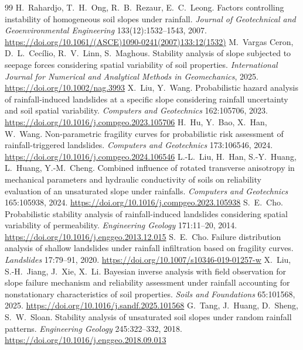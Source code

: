 \documentclass[11pt,a4paper]{article}
\begin{document}
\begin{thebibliography}{99}\small
{} H.~Rahardjo, T.~H.~Ong, R.~B.~Rezaur, E.~C.~Leong. Factors controlling instability of
  homogeneous soil slopes under rainfall. \emph{Journal of Geotechnical and Geoenvironmental Engineering}
  133(12):1532--1543, 2007. \url{https://doi.org/10.1061/(ASCE)1090-0241(2007)133:12(1532)}
 M.~Vargas Ceron, D.~L.~Cecílio, R.~V.~Linn, S.~Maghous. Stability analysis of slope subjected to
  seepage forces considering spatial variability of soil properties. \emph{International Journal for Numerical and
  Analytical Methods in Geomechanics}, 2025. \url{https://doi.org/10.1002/nag.3993}
 X.~Liu, Y.~Wang. Probabilistic hazard analysis of rainfall-induced landslides at a specific slope
  considering rainfall uncertainty and soil spatial variability. \emph{Computers and Geotechnics} 162:105706, 2023.
  \url{https://doi.org/10.1016/j.compgeo.2023.105706}
 H.~Hu, Y.~Bao, X.~Han, W.~Wang. Non-parametric fragility curves for probabilistic risk assessment of
  rainfall-triggered landslides. \emph{Computers and Geotechnics} 173:106546, 2024.
  \url{https://doi.org/10.1016/j.compgeo.2024.106546}
 L.-L.~Liu, H.~Han, S.-Y.~Huang, L.~Huang, Y.-M.~Cheng. Combined influence of rotated transverse
  anisotropy in mechanical parameters and hydraulic conductivity of soils on reliability evaluation of an unsaturated
  slope under rainfalls. \emph{Computers and Geotechnics} 165:105938, 2024.
  \url{https://doi.org/10.1016/j.compgeo.2023.105938}
 S.~E.~Cho. Probabilistic stability analysis of rainfall-induced landslides considering spatial
  variability of permeability. \emph{Engineering Geology} 171:11--20, 2014.
  \url{https://doi.org/10.1016/j.enggeo.2013.12.015}
 S.~E.~Cho. Failure distribution analysis of shallow landslides under rainfall infiltration based on
  fragility curves. \emph{Landslides} 17:79--91, 2020. \url{https://doi.org/10.1007/s10346-019-01257-w}
 X.~Liu, S.-H.~Jiang, J.~Xie, X.~Li. Bayesian inverse analysis with field observation for slope
  failure mechanism and reliability assessment under rainfall accounting for nonstationary characteristics of soil
  properties. \emph{Soils and Foundations} 65:101568, 2025. \url{https://doi.org/10.1016/j.sandf.2025.101568}
 G.~Tang, J.~Huang, D.~Sheng, S.~W.~Sloan. Stability analysis of unsaturated soil slopes under random
  rainfall patterns. \emph{Engineering Geology} 245:322--332, 2018. \url{https://doi.org/10.1016/j.enggeo.2018.09.013}

\end{thebibliography}
\end{document}
